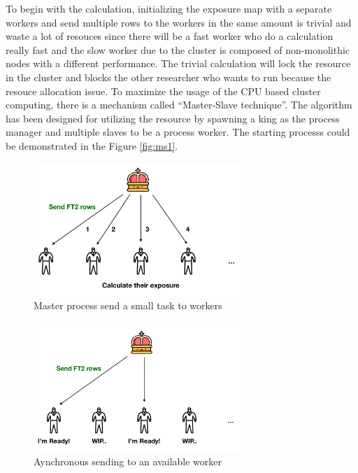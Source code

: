 To begin with the calculation, initializing the exposure map with a 
separate workers and send multiple rows to the workers in the same amount
is trivial and waste a lot of resouces since there will be a fast worker 
who do a calculation really fast and the slow worker due to the cluster 
is composed of non-monolithic nodes with a different performance.
The trivial calculation will lock the resource in the cluster and blocks 
the other researcher who wants to run because the resouce allocation issue.
To maximize the usage of the CPU based cluster computing, there is a 
mechanism called ``Master-Slave technique''. The algorithm has been designed 
for utilizing the resource by spawning a king as the process manager 
and multiple slaves to be a process worker. The starting processs could 
be demonstrated in the Figure \ref{fig:ms1}. 


\begin{figure}[h]
    \centering
    \includegraphics[width=0.7\textwidth]{content/methodology/figures/ms2}
    \caption{Master process send a small task to workers}
    \label{fig:ms2}
\end{figure}


\begin{figure}[h]
    \centering
    \includegraphics[width=0.7\textwidth]{content/methodology/figures/ms3}
    \caption{Aynchronous sending to an available worker}
    \label{fig:ms3}
\end{figure}


